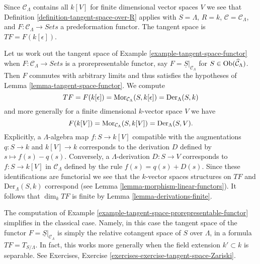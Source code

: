 \begin{example}
\label{example-tangent-space-functor}
Since $\mathcal{C}_\Lambda$ contains all $k[V]$ for finite dimensional
vector spaces $V$ we see that
Definition \ref{definition-tangent-space-over-R} applies with
$S = \Lambda$, $R = k$, $\mathcal{C} = \mathcal{C}_\Lambda$, and
$F : \mathcal{C}_\Lambda \to \textit{Sets}$ a
predeformation functor. The tangent space is $TF = F(k[\epsilon])$.
\end{example}

\begin{example}
\label{example-tangent-space-prorepresentable-functor}
Let us work out the tangent space of
Example \ref{example-tangent-space-functor}
when $F : \mathcal{C}_\Lambda \to \textit{Sets}$ is a
prorepresentable functor, say $F = \underline{S}|_{\mathcal{C}_\Lambda}$
for $S \in \mathop{\rm Ob}\nolimits(\widehat{\mathcal{C}}_\Lambda)$. Then $F$ commutes
with arbitrary limits and thus satisfies the hypotheses of
Lemma \ref{lemma-tangent-space-functor}.
We compute
$$
TF = F(k[\epsilon]) = \mathop{\rm Mor}\nolimits_{\mathcal{C}_\Lambda}(S, k[\epsilon])
= \text{Der}_\Lambda(S, k)
$$
and more generally for a finite dimensional $k$-vector space $V$ we have
$$
F(k[V]) = \mathop{\rm Mor}\nolimits_{\mathcal{C}_\Lambda}(S, k[V]) = \text{Der}_\Lambda(S, V).
$$
Explicitly, a $\Lambda$-algebra map $f : S \to k[V]$ compatible with
the augmentations $q : S \to k$ and $k[V] \to k$ corresponds to the derivation
$D$ defined by $s \mapsto f(s) - q(s)$. Conversely, a
$\Lambda$-derivation $D : S \to V$ corresponds to $f : S \to k[V]$
in $\mathcal{C}_\Lambda$ defined by the rule $f(s) = q(s) + D(s)$. Since
these identifications are functorial we see that the $k$-vector spaces
structures on $TF$ and $\text{Der}_\Lambda(S, k)$ correspond (see
Lemma \ref{lemma-morphism-linear-functors}).
It follows that $\dim_k TF$ is finite by
Lemma \ref{lemma-derivations-finite}.
\end{example}

\begin{example}
\label{example-tangent-space-classical-prorepresentable-functor}
The computation of
Example \ref{example-tangent-space-prorepresentable-functor}
simplifies in the classical case. Namely, in this case
the tangent space of the functor
$F = \underline{S}|_{\mathcal{C}_\Lambda}$ is simply the
relative cotangent space of $S$ over $\Lambda$, in a formula
$TF = T_{S/\Lambda}$. In fact, this works more generally when the
field extension $k' \subset k$ is separable. See
Exercises, Exercise \ref{exercises-exercise-tangent-space-Zariski}.
\end{example}

